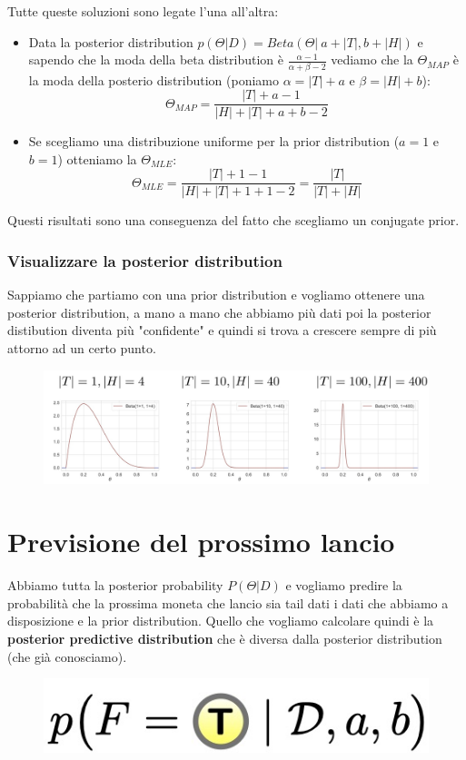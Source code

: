 \documentclass[14pt]{extreport}
\begin{document}
Tutte queste soluzioni sono legate l'una all'altra:
\begin{itemize}
\item Data la posterior distribution $p(\Theta|D) = Beta(\Theta|\ a+|T|, b+|H|)$ e sapendo che la moda della beta distribution è $\frac{\alpha -1
}{\alpha + \beta - 2}$ vediamo che la $\Theta_{MAP}$ è la moda della posterio distribution (poniamo $\alpha=|T|+a$ e $\beta=|H|+b$):
$$\Theta_{MAP}=\frac{|T|+a-1}{|H|+|T|+a+b-2}$$
\item Se scegliamo una distribuzione uniforme per la prior distribution ($a=1$ e $b=1$) otteniamo la $\Theta_{MLE}$:
$$\Theta_{MLE}=\frac{|T|+1-1}{|H|+|T|+1+1-2} = \frac{|T|}{|T|+|H|}$$
\end{itemize}
Questi risultati sono una conseguenza del fatto che scegliamo un conjugate prior.

\subsubsection{Visualizzare la posterior distribution}

Sappiamo che partiamo con una prior distribution e vogliamo ottenere una posterior distribution, a mano a mano che abbiamo più dati poi la posterior
distibution diventa più "confidente" e quindi si trova a crescere sempre di più attorno ad un certo punto.
\begin{figure}[H]
\centering
\includegraphics[width=0.7\linewidth]{47.jpeg}
\end{figure}


\section{Previsione del prossimo lancio}

Abbiamo tutta la posterior probability $P(\Theta | D)$ e vogliamo predire la probabilità che la prossima moneta che lancio sia tail dati i dati che
abbiamo a disposizione e la prior distribution. Quello che vogliamo calcolare quindi è la \textbf{posterior predictive distribution} che è diversa
dalla posterior distribution (che già conosciamo).
 
\begin{figure}[H]
\centering
\includegraphics[width=0.3\linewidth]{48.jpeg}
\end{figure}
\end{document}
